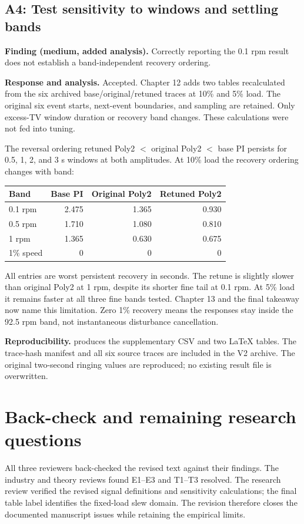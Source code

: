 \documentclass[11pt,a4paper]{article}
\newcommand{\finding}[2]{\subsection*{#1: #2}}
\begin{document}
\clearpage
\finding{A4}{Test sensitivity to windows and settling bands}
\textbf{Finding (medium, added analysis).} Correctly reporting the 0.1 rpm result does not establish a band-independent recovery ordering.

\textbf{Response and analysis.} Accepted. Chapter 12 adds two tables recalculated from the six archived base/original/retuned traces at 10\% and 5\% load. The original six event starts, next-event boundaries, and sampling are retained. Only excess-TV window duration or recovery band changes. These calculations were not fed into tuning.

The reversal ordering retuned Poly2 $<$ original Poly2 $<$ base PI persists for 0.5, 1, 2, and 3 s windows at both amplitudes. At 10\% load the recovery ordering changes with band:
\begin{center}\begin{tabular}{@{}lrrr@{}}\toprule
Band & Base PI & Original Poly2 & Retuned Poly2\\\midrule
0.1 rpm & 2.475 & 1.365 & 0.930\\
0.5 rpm & 1.710 & 1.080 & 0.810\\
1 rpm & 1.365 & 0.630 & 0.675\\
1\% speed & 0 & 0 & 0\\\bottomrule
\end{tabular}\end{center}
All entries are worst persistent recovery in seconds. The retune is slightly slower than original Poly2 at 1 rpm, despite its shorter fine tail at 0.1 rpm. At 5\% load it remains faster at all three fine bands tested. Chapter 13 and the final takeaway now name this limitation. Zero 1\% recovery means the responses stay inside the 92.5 rpm band, not instantaneous disturbance cancellation.

\textbf{Reproducibility.}  produces the supplementary CSV and two LaTeX tables. The trace-hash manifest and all six source traces are included in the V2 archive. The original two-second ringing values are reproduced; no existing result file is overwritten.

\section*{Back-check and remaining research questions}
All three reviewers back-checked the revised text against their findings. The industry and theory reviews found E1--E3 and T1--T3 resolved. The research review verified the revised signal definitions and sensitivity calculations; the final table label identifies the fixed-load slew domain. The revision therefore closes the documented manuscript issues while retaining the empirical limits.
\end{document}

